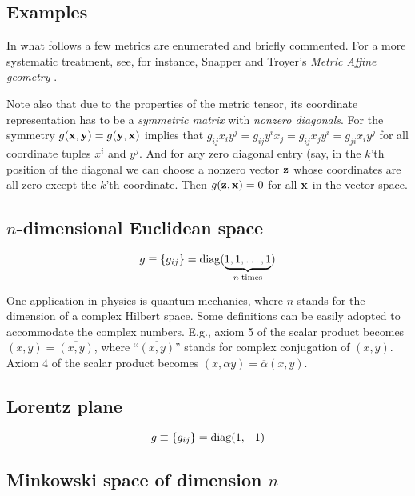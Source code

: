 \subsection{Examples}

In what follows a few metrics are enumerated and briefly commented.
For a more systematic treatment, see, for instance, Snapper and Troyer's {\em Metric Affine geometry} \cite{snapper-troyer}.

Note also that due to the properties of the metric tensor, its coordinate representation has to be a {\em symmetric matrix}
with {\em nonzero diagonals}.
For the symmetry $g( {\bf x}  ,{\bf y} )=g({\bf y} ,{\bf x} )$ implies that $g_{ij}x_iy^j= g_{ij}y^ix_j=  g_{ij}x_jy^i= g_{ji}x_iy^j$ for all coordinate tuples
$x^i$ and $y^j$. And for any zero diagonal entry (say, in the $k$'th position of the diagonal we can choose a nonzero vector  ${\bf z}$
whose coordinates are all zero except the $k$'th coordinate. Then $g ({\bf z},{\bf x})=0$ for all ${\bf x}$ in the vector space.


\subsection*{$n$-dimensional Euclidean space}

\begin{equation}
g\equiv \{g_{ij}\}={\rm diag} (\underbrace{1,1,\ldots ,1}_{n\; {\rm times}})
\end{equation}

One application in physics is quantum mechanics,
where $n$ stands for the dimension of a complex Hilbert space.
Some definitions can be easily adopted to accommodate the complex numbers.
E.g., axiom 5 of the scalar product becomes
$(x,y)=\overline{(x,y)}$, where ``$\overline{(x,y)}$'' stands for complex conjugation of $(x,y)$.
Axiom 4 of the scalar product becomes
$(x,\alpha y)=\overline{\alpha} (x,y)$.

\subsection*{Lorentz plane}


\begin{equation}
g\equiv \{g_{ij}\}={\rm diag} (1,-1)
\end{equation}

\subsection*{Minkowski space of dimension $n$}

